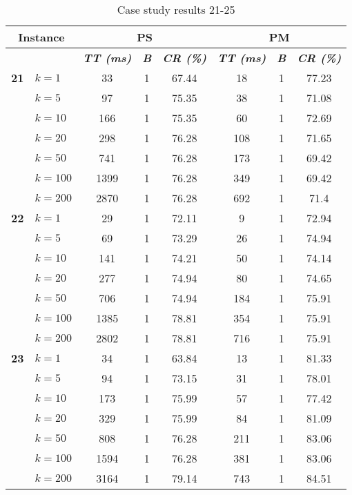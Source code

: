     \begin{table}[htbp]
    \caption{Case study results 21-25}
    \centering
    \begin{tabular}{|l|l|c|c|c|c|c|c|}
    \hline
    \multicolumn{ 2}{|c|}{\textbf{Instance}} & \multicolumn{ 3}{c|}{\textbf{PS}} & \multicolumn{ 3}{c|}{\textbf{PM}} \\ \hline
    \multicolumn{ 2}{|l|}{} & \textbf{\textit{TT (ms)}} & \textbf{\textit{B}} & \textbf{\textit{CR (\%)}} & \textbf{\textit{TT (ms)}} & \textbf{\textit{B}} & \textbf{\textit{CR (\%)}} \\ \hline
    \multicolumn{1}{|r|}{\textbf{21}} & $k=1$ & 33 & 1 & 67.44 & 18 & 1 & 77.23 \\ 
     & $k=5$ & 97 & 1 & 75.35 & 38 & 1 & 71.08 \\ 
     & $k=10$ & 166 & 1 & 75.35 & 60 & 1 & 72.69 \\ 
     & $k=20$ & 298 & 1 & 76.28 & 108 & 1 & 71.65 \\ 
     & $k=50$ & 741 & 1 & 76.28 & 173 & 1 & 69.42 \\ 
     & $k=100$ & 1399 & 1 & 76.28 & 349 & 1 & 69.42 \\ 
     & $k=200$ & 2870 & 1 & 76.28 & 692 & 1 & 71.4 \\ \hline
    \multicolumn{1}{|r|}{\textbf{22}} & $k=1$ & 29 & 1 & 72.11 & 9 & 1 & 72.94 \\ 
     & $k=5$ & 69 & 1 & 73.29 & 26 & 1 & 74.94 \\ 
     & $k=10$ & 141 & 1 & 74.21 & 50 & 1 & 74.14 \\ 
     & $k=20$ & 277 & 1 & 74.94 & 80 & 1 & 74.65 \\ 
     & $k=50$ & 706 & 1 & 74.94 & 184 & 1 & 75.91 \\ 
     & $k=100$ & 1385 & 1 & 78.81 & 354 & 1 & 75.91 \\ 
     & $k=200$ & 2802 & 1 & 78.81 & 716 & 1 & 75.91 \\ \hline
    \multicolumn{1}{|r|}{\textbf{23}} & $k=1$ & 34 & 1 & 63.84 & 13 & 1 & 81.33 \\ 
     & $k=5$ & 94 & 1 & 73.15 & 31 & 1 & 78.01 \\ 
     & $k=10$ & 173 & 1 & 75.99 & 57 & 1 & 77.42 \\ 
     & $k=20$ & 329 & 1 & 75.99 & 84 & 1 & 81.09 \\ 
     & $k=50$ & 808 & 1 & 76.28 & 211 & 1 & 83.06 \\ 
     & $k=100$ & 1594 & 1 & 76.28 & 381 & 1 & 83.06 \\ 
     & $k=200$ & 3164 & 1 & 79.14 & 743 & 1 & 84.51 \\ \hline

\end{tabular}
\end{table}
